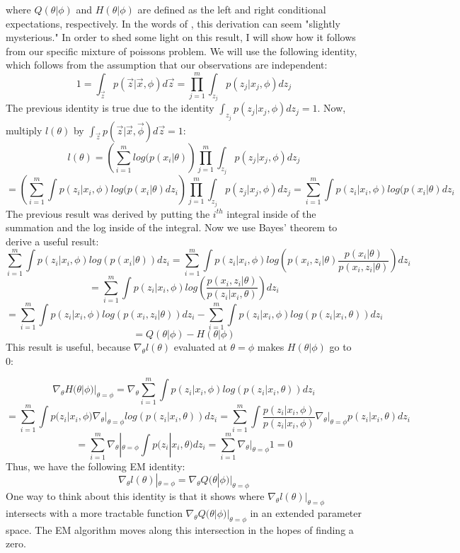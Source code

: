 \documentclass[letter,12pt]{article}
\begin{document}
where $Q(\theta|\phi)$ and $H(\theta|\phi)$ are defined as the left and right conditional expectations, respectively.  In the words of \cite{lange1995a}, this derivation can seem "slightly mysterious."  In order to shed some light on this result, I will show how it follows from our specific mixture of poissons problem.  We will use the following identity, which follows from the assumption that our observations are independent:
\[
1 = \int_{\vec{z}}p(\vec{z}|\vec{x},\phi)d\vec{z}
= \prod_{j=1}^{m}\int_{z_j}p(z_j|x_j,\phi)dz_j
\]
The previous identity is true due to the identity $\int_{z_j}p(z_j|x_j,\phi)dz_j=1$.  Now, multiply $l(\theta)$ by $\int_{\vec{z}}p(\vec{z}|\vec{x},\vec{\phi})d\vec{z}=1$:
\[
l(\theta)
= \left( \sum_{i=1}^{m} log(p(x_i|\theta)\right)
\prod_{j=1}^{m}\int_{z_j}p(z_j|x_j,\phi)dz_j
\]
\[
= \left( \sum_{i=1}^{m} \int p(z_i|x_i,\phi)log(p(x_i|\theta)dz_i\right)
\prod_{j=1}^{m}\int_{z_j}p(z_j|x_j,\phi)dz_j
=\sum_{i=1}^{m} \int p(z_i|x_i,\phi)log(p(x_i|\theta)dz_i
\]
The previous result was derived by putting the $i^{th}$ integral inside of the summation and the log inside of the integral.  Now we use Bayes' theorem to derive a useful result:
\[
\sum_{i=1}^{m} \int p(z_i|x_i,\phi)log(p(x_i|\theta))dz_i
= \sum_{i=1}^{m} \int p(z_i|x_i,\phi) log \left(p(x_i,z_i|\theta)\frac{p(x_i|\theta)}{p(x_i,z_i|\theta)}\right) dz_i
\]
\[
=
\sum_{i=1}^{m} \int p(z_i|x_i,\phi) log \left(\frac{p(x_i,z_i|\theta)}{p(z_i|x_i,\theta)}\right) dz_i
\]
\[
=
\sum_{i=1}^{m} \int p(z_i|x_i,\phi) log \left(p(x_i,z_i|\theta)\right) dz_i
-
\sum_{i=1}^{m} \int p(z_i|x_i,\phi) log \left(p(z_i|x_i,\theta)\right) dz_i
\] 
\[
=Q(\theta|\phi)
-H(\theta|\phi)
\]
This result is useful, because $\nabla_{\theta}l(\theta)$ evaluated at $\theta = \phi$ makes $H(\theta|\phi)$ go to 0: 

\[
\nabla_{\theta}H(\theta|\phi)|_{\theta = \phi}
=
\nabla_{\theta}\sum_{i=1}^{m} \int p(z_i|x_i,\phi) log \left(p(z_i|x_i,\theta)\right) dz_i
\]
\[
=
\sum_{i=1}^{m} 
\int p(z_i|x_i,\phi) 
\nabla_{\theta}|_{\theta = \phi}
log \left(p(z_i|x_i,\theta)\right) dz_i
=
\sum_{i=1}^{m} 
\int \dfrac{p(z_i|x_i,\phi)}{p(z_i|x_i,\phi)} 
\nabla_{\theta}|_{\theta = \phi}
p(z_i|x_i,\theta) dz_i
\]
\[
=
\sum_{i=1}^{m} 
\nabla_{\theta}|_{\theta = \phi}
\int 
p(z_i|x_i,\theta) dz_i
=
\sum_{i=1}^{m} 
\nabla_{\theta}|_{\theta = \phi}
1
=0
\]
Thus, we have the following EM identity:
\[
\nabla_{\theta}l(\theta)|_{\theta = \phi}
=
\nabla_{\theta}Q(\theta|\phi)|_{\theta = \phi}
\]
One way to think about this identity is that it shows where $\nabla_{\theta}l(\theta)|_{\theta = \phi}$ intersects with a more tractable function $\nabla_{\theta}Q(\theta|\phi)|_{\theta = \phi}$ in an extended parameter space.  The EM algorithm moves along this intersection in the hopes of finding a zero.
\end{document}
